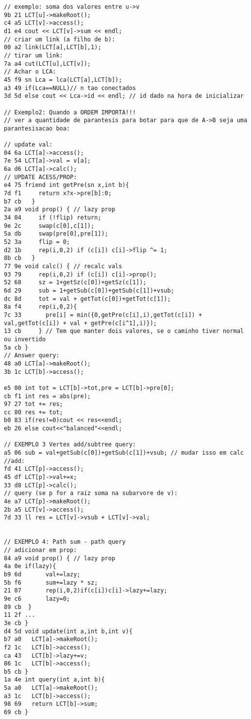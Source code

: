 \documentclass[11pt, a4paper, twoside]{article}
\begin{document}
\begin{lstlisting}
// exemplo: soma dos valores entre u->v
9b 21 LCT[u]->makeRoot();
c4 a5 LCT[v]->access();
d1 e4 cout << LCT[v]->sum << endl;
// criar um link (a filho de b):
00 a2 link(LCT[a],LCT[b],1);
// tirar um link:
7a a4 cut(LCT[u],LCT[v]);
// Achar o LCA:
45 f9 sn Lca = lca(LCT[a],LCT[b]);
a3 49 if(Lca==NULL)// n tao conectados
3d 5d else cout << Lca->id << endl; // id dado na hora de inicializar 

// Exemplo2: Quando a ORDEM IMPORTA!!!
// ver a quantidade de parantesis para botar para que de A->B seja uma parantesisacao boa:

// update val:
04 6a LCT[a]->access();
7e 54 LCT[a]->val = v[a];
6a d6 LCT[a]->calc();
// UPDATE ACESS/PROP:
e4 75 friend int getPre(sn x,int b){
7d f1     return x?x->pre[b]:0;
b7 cb   }
2a a9 void prop() { // lazy prop
34 04     if (!flip) return;
9e 2c     swap(c[0],c[1]);
5a db     swap(pre[0],pre[1]);
52 3a     flip = 0;
d2 1b     rep(i,0,2) if (c[i]) c[i]->flip ^= 1;
8b cb   }
77 9e void calc() { // recalc vals
93 79     rep(i,0,2) if (c[i]) c[i]->prop();
52 68     sz = 1+getSz(c[0])+getSz(c[1]);
6d 29     sub = 1+getSub(c[0])+getSub(c[1])+vsub;
dc 8d     tot = val + getTot(c[0])+getTot(c[1]);
8a f4     rep(i,0,2){
7c 33       pre[i] = min({0,getPre(c[i],i),getTot(c[i]) + val,getTot(c[i]) + val + getPre(c[i^1],i)});
13 cb     } // Tem que manter dois valores, se o caminho tiver normal ou invertido
5a cb }
// Answer query:
48 a0 LCT[a]->makeRoot();
3b 1c LCT[b]->access();

e5 00 int tot = LCT[b]->tot,pre = LCT[b]->pre[0];
cb f1 int res = abs(pre);
97 27 tot += res;
cc 80 res += tot;
b0 83 if(res!=0)cout << res<<endl;
eb 26 else cout<<"balanced"<<endl;

// EXEMPLO 3 Vertex add/subtree query:
a5 06 sub = val+getSub(c[0])+getSub(c[1])+vsub; // mudar isso em calc
//add:
fd 41 LCT[p]->access();
45 df LCT[p]->val+=x;
33 d8 LCT[p]->calc();
// query (se p for a raiz soma na subarvore de v):
4e a7 LCT[p]->makeRoot();
2b a5 LCT[v]->access();
7d 33 ll res = LCT[v]->vsub + LCT[v]->val;


// EXEMPLO 4: Path sum - path query
// adicionar em prop:
84 a9 void prop() { // lazy prop
4a 0e if(lazy){
b9 6d       val+=lazy;
5b f6       sum+=lazy * sz;
21 07       rep(i,0,2)if(c[i])c[i]->lazy+=lazy;
9e c6       lazy=0;
89 cb  }
11 2f ...
3e cb }
d4 5d void update(int a,int b,int v){
b7 a0   LCT[a]->makeRoot();
f2 1c   LCT[b]->access();
ca 43   LCT[b]->lazy+=v;
86 1c   LCT[b]->access();
b5 cb }
1a 4e int query(int a,int b){
5a a0   LCT[a]->makeRoot();
a3 1c   LCT[b]->access();
98 69   return LCT[b]->sum;
69 cb }
\end{lstlisting}
\end{document}
